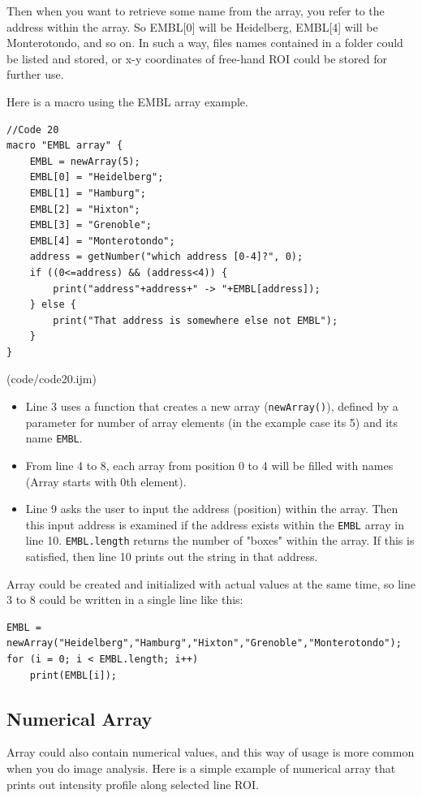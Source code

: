 \documentclass[11pt,a4paper,oneside]{report}
\newcommand{\ilcom}[1]{\texttt{\small#1}}
\begin{document}
Then when you want to retrieve some name from the array, you refer to the address within the array. 
So EMBL[0] will be Heidelberg, EMBL[4] will be Monterotondo, and so on. 
In such a way, files names contained in a folder could be listed and stored, 
or x-y coordinates of free-hand ROI could be stored for further use. 

Here is a macro using the EMBL array example. 


\begin{lstlisting}[morekeywords={*, newArray}]
//Code 20
macro "EMBL array" {
	EMBL = newArray(5);
	EMBL[0] = "Heidelberg";
	EMBL[1] = "Hamburg";
	EMBL[2] = "Hixton";
	EMBL[3] = "Grenoble";
	EMBL[4] = "Monterotondo";
	address = getNumber("which address [0-4]?", 0);	
	if ((0<=address) && (address<4)) {
		print("address"+address+" -> "+EMBL[address]); 
	} else {
		print("That address is somewhere else not EMBL");
	}
}
\end{lstlisting}
(code/code20.ijm)

\begin{itemize}
\item Line 3 uses a function that creates a new array (\ilcom{newArray()}),
defined by a parameter for number of array elements (in the example case its 5) and its name \ilcom{EMBL}.
\item From line 4 to 8, each array from position 0 to 4 will be filled with
names (Array starts with 0th element).
\item Line 9 asks the user to input the address (position) within the array.
Then this input address is examined if the address exists within the
\ilcom{EMBL} array in line 10. \ilcom{EMBL.length} returns the number of "boxes"
within the array. If this is satisfied, then line 10 prints out the string in that address.
\end{itemize}

Array could be created and initialized with actual values at the
same time, so line 3 to 8 could be written in a single line like this: 
\begin{lstlisting}[numbers=none]
EMBL = newArray("Heidelberg","Hamburg","Hixton","Grenoble","Monterotondo");
for (i = 0; i < EMBL.length; i++)
    print(EMBL[i]);
\end{lstlisting}   \subsection{Numerical Array}
\label{subsec:numericalarray}
Array could also contain numerical values, and this way of usage is more common when you do image analysis. Here is a simple example of numerical array that prints out intensity profile along selected line ROI. 
\end{document}
